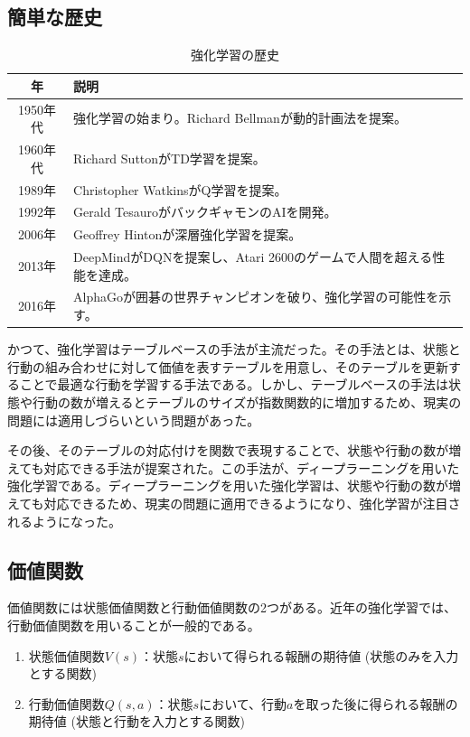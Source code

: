 \documentclass{ltjsarticle}
\begin{document}
\subsection{簡単な歴史}
\begin{table}[ht]
  \centering
  \begin{tabular}{|c|p{10cm}|}
  \hline
  年 & 説明 \\
  \hline
  1950年代 & 強化学習の始まり。Richard Bellmanが動的計画法を提案。 \\
  1960年代 & Richard SuttonがTD学習を提案。 \\
  1989年 & Christopher WatkinsがQ学習を提案。 \\
  1992年 & Gerald TesauroがバックギャモンのAIを開発。 \\
  2006年 & Geoffrey Hintonが深層強化学習を提案。 \\
  2013年 & DeepMindがDQNを提案し、Atari 2600のゲームで人間を超える性能を達成。 \\
  2016年 & AlphaGoが囲碁の世界チャンピオンを破り、強化学習の可能性を示す。 \\
  \hline
  \end{tabular}
  \caption{強化学習の歴史}
  \label{tab:comparison}
\end{table}
\par
かつて、強化学習はテーブルベースの手法が主流だった。その手法とは、状態と行動の組み合わせに対して価値を表すテーブルを用意し、そのテーブルを更新することで最適な行動を学習する手法である。しかし、テーブルベースの手法は状態や行動の数が増えるとテーブルのサイズが指数関数的に増加するため、現実の問題には適用しづらいという問題があった。
\par
その後、そのテーブルの対応付けを関数で表現することで、状態や行動の数が増えても対応できる手法が提案された。この手法が、ディープラーニングを用いた強化学習である。ディープラーニングを用いた強化学習は、状態や行動の数が増えても対応できるため、現実の問題に適用できるようになり、強化学習が注目されるようになった。

\subsection{価値関数}
価値関数には状態価値関数と行動価値関数の2つがある。近年の強化学習では、行動価値関数を用いることが一般的である。
\begin{enumerate}
  \item 状態価値関数$V(s)$：状態$s$において得られる報酬の期待値 (状態のみを入力とする関数)
  \item 行動価値関数$Q(s,a)$：状態$s$において、行動$a$を取った後に得られる報酬の期待値 (状態と行動を入力とする関数)
\end{enumerate}
\end{document}

